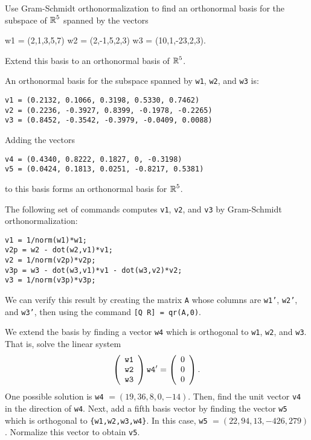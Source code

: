 \documentclass{ximera}
\begin{document}
\begin{exercise} \label{c7.5.4}
Use Gram-Schmidt orthonormalization to find an orthonormal basis for the
subspace of $\mbox{$\Bbb{R}$}^5$ spanned by the vectors
\begin{matlabEquation}\label{MATLAB:61}
w1 = (2,1,3,5,7) \quad w2 = (2,-1,5,2,3) \AND w3 = (10,1,-23,2,3).
\end{matlabEquation}
Extend this basis to an orthonormal basis of $\mbox{$\Bbb{R}$}^5$.

\begin{solution}

\ans
An orthonormal basis for the subspace spanned by {\tt w1}, {\tt w2},
and {\tt w3} is:
\begin{verbatim}
v1 = (0.2132, 0.1066, 0.3198, 0.5330, 0.7462)
v2 = (0.2236, -0.3927, 0.8399, -0.1978, -0.2265)
v3 = (0.8452, -0.3542, -0.3979, -0.0409, 0.0088)
\end{verbatim}
Adding the vectors
\begin{verbatim}
v4 = (0.4340, 0.8222, 0.1827, 0, -0.3198)
v5 = (0.0424, 0.1813, 0.0251, -0.8217, 0.5381)
\end{verbatim}
to this basis forms an orthonormal basis for $\mbox{$\Bbb{R}$}^5$.

\soln The following set of \Matlab commands computes {\tt v1}, {\tt v2},
and {\tt v3} by Gram-Schmidt orthonormalization:
\begin{verbatim}
v1 = 1/norm(w1)*w1;
v2p = w2 - dot(w2,v1)*v1;
v2 = 1/norm(v2p)*v2p;
v3p = w3 - dot(w3,v1)*v1 - dot(w3,v2)*v2;
v3 = 1/norm(v3p)*v3p;
\end{verbatim}
We can verify this result by creating the matrix {\tt A} whose columns
are {\tt w1'}, {\tt w2'}, and {\tt w3'}, then using the command
{\tt [Q R] = qr(A,0)}.

\para We extend the basis by finding a vector {\tt w4} which is
orthogonal to {\tt w1}, {\tt w2}, and {\tt w3}.  That is, solve the
linear system
\[
\left(\begin{array}{r} {\tt w1} \\ {\tt w2} \\ {\tt w3}\end{array}\right){\tt w4'} = \left(\begin{array}{r} 0 \\ 0 \\ 0\end{array}\right). \]
One possible solution is {\tt w4} $= (19,36,8,0,-14)$.  Then, find
the unit vector {\tt v4} in the direction of {\tt w4}.  Next, add a
fifth basis vector by finding the vector {\tt w5} which is orthogonal
to {\tt \{w1,w2,w3,w4\}}.  In this case, {\tt w5}
$= (22,94,13,-426,279)$.  Normalize this vector to obtain {\tt v5}.




\end{solution}
\end{exercise}
\end{document}
